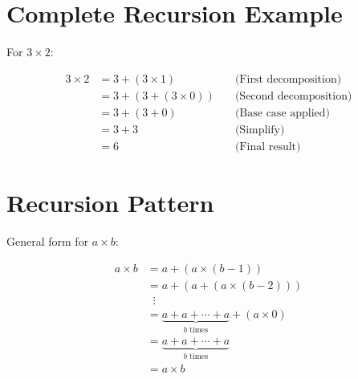 \documentclass{article}
\begin{document}
\section{Complete Recursion Example}
For \(3 \times 2\):

\[
    \begin{aligned}
        3 \times 2 & = 3 + (3 \times 1) \quad       & \text{(First decomposition)}  \\
                   & = 3 + (3 + (3 \times 0)) \quad & \text{(Second decomposition)} \\
                   & = 3 + (3 + 0) \quad            & \text{(Base case applied)}    \\
                   & = 3 + 3 \quad                  & \text{(Simplify)}             \\
                   & = 6 \quad                      & \text{(Final result)}
    \end{aligned}
\]

\section*{Recursion Pattern}
General form for \(a \times b\):

\[
    \begin{aligned}
        a \times b & = a + (a \times (b-1))                                             \\
                   & = a + (a + (a \times (b-2)))                                       \\
                   & \;\;\vdots                                                         \\
                   & = \underbrace{a + a + \cdots + a}_{b \text{ times}} + (a \times 0) \\
                   & = \underbrace{a + a + \cdots + a}_{b \text{ times}}                \\
                   & = a \times b
    \end{aligned}
\]
\end{document}
